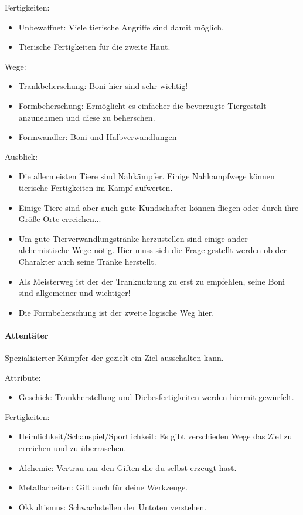 \documentclass{article}
\begin{document}
Fertigkeiten:
\begin{itemize}
\item Unbewaffnet: Viele tierische Angriffe sind damit möglich.
\item Tierische Fertigkeiten für die zweite Haut.
\end{itemize}

Wege:
\begin{itemize}
\item Trankbeherschung: Boni hier sind sehr wichtig!
\item Formbeherschung: Ermöglicht es einfacher die bevorzugte Tiergestalt anzunehmen und diese zu beherschen.
\item Formwandler: Boni und Halbverwandlungen
\end{itemize}

Ausblick:
\begin{itemize}
\item Die allermeisten Tiere sind Nahkämpfer. Einige Nahkampfwege können tierische Fertigkeiten im Kampf aufwerten.
\item Einige Tiere sind aber auch gute Kundschafter können fliegen oder durch ihre Größe Orte erreichen...
\item Um gute Tierverwandlungstränke herzustellen sind einige ander alchemistische Wege nötig. Hier muss sich die Frage gestellt werden ob der Charakter auch seine Tränke herstellt.
\item Als Meisterweg ist der der Tranknutzung zu erst zu empfehlen, seine Boni sind allgemeiner und wichtiger!
\item Die Formbeherschung ist der zweite logische Weg hier.
\end{itemize}

\paragraph{Attentäter}
Spezialisierter Kämpfer der gezielt ein Ziel ausschalten kann.

Attribute:
\begin{itemize}
\item Geschick: Trankherstellung und Diebesfertigkeiten werden hiermit gewürfelt.
\end{itemize}

Fertigkeiten:
\begin{itemize}
\item Heimlichkeit/Schauspiel/Sportlichkeit: Es gibt verschieden Wege das Ziel zu erreichen und zu überraschen.
\item Alchemie: Vertrau nur den Giften die du selbst erzeugt hast.
\item Metallarbeiten: Gilt auch für deine Werkzeuge.
\item Okkultismus: Schwachstellen der Untoten verstehen.
\end{itemize}
\end{document}
